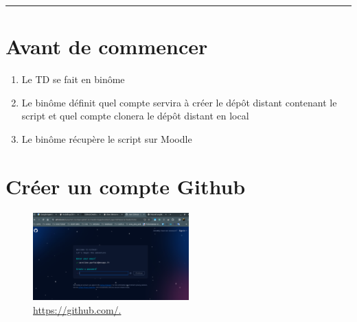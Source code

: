\newcommand{\numTD}{TD3}
\newcommand{\themeTD}{Clustering avec un algorithme d'affinité de propagation}
\newcommand{\file}{toto.tex}



\hrule

\noindent{}
\newline
\section{Avant de commencer}

\begin{enumerate}
\item Le TD se fait en binôme
\item Le binôme définit quel compte servira à créer le dépôt distant contenant le script et quel compte clonera le dépôt distant en local
\item Le binôme récupère le script sur Moodle
\end{enumerate}

\noindent{}

\section{Créer un compte Github}



\begin{figure}[H]
\caption{\url{https://github.com/.}}
  \includegraphics[width=6cm]{images/github_inscription.png}
  
  \end{figure}

